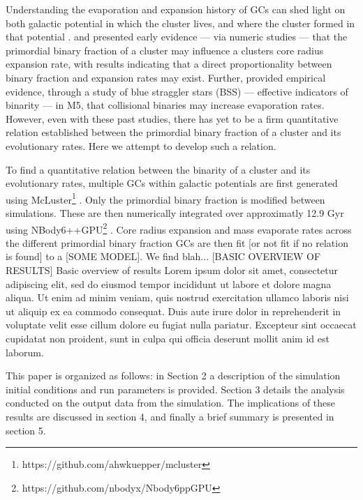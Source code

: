 \documentclass[twocolumn]{aastex62}
\newcommand{\colorred}[1]{\color{red}#1\color{black}\hspace{0.5mm}}
\begin{document}
Understanding the evaporation and expansion history of GCs can shed light on both galactic potential in which the cluster lives, and where the cluster formed in that potential \citep{Ren17}. \citet{Wil03} and \citet{Gon05} presented early evidence --- via numeric studies --- that the primordial binary fraction of a cluster may influence a clusters core radius expansion rate, with results indicating that a direct proportionality between binary fraction and expansion rates may exist. Further, \citet{Lan07} provided empirical evidence, through a study of blue straggler stars (BSS) --- effective indicators of binarity --- in M5, that collisional binaries may increase evaporation rates. However, even with these past studies, there has yet to be a firm quantitative relation established between the primordial binary fraction of a cluster and its evolutionary rates. Here we attempt to develop such a relation.

To find a quantitative relation between the binarity of a cluster and its evolutionary rates, multiple GCs within galactic potentials are first generated using McLuster\footnote{https://github.com/ahwkuepper/mcluster} \citep{Kup11}. Only the primordial binary fraction is modified between simulations. These are then numerically integrated over approximatly 12.9 Gyr using NBody6++GPU\footnote{https://github.com/nbodyx/Nbody6ppGPU} \citep{Wan15}.  Core radius expansion and mass evaporate rates across the different primordial binary fraction GCs are then fit \colorred{[or not fit if no relation is found]} to a \colorred{[SOME MODEL]}.  We find blah...\colorred{ [BASIC OVERVIEW OF RESULTS] Basic overview of results Lorem ipsum dolor sit amet, consectetur adipiscing elit, sed do eiusmod tempor incididunt ut labore et dolore magna aliqua. Ut enim ad minim veniam, quis nostrud exercitation ullamco laboris nisi ut aliquip ex ea commodo consequat. Duis aute irure dolor in reprehenderit in voluptate velit esse cillum dolore eu fugiat nulla pariatur. Excepteur sint occaecat cupidatat non proident, sunt in culpa qui officia deserunt mollit anim id est laborum.}

This paper is organized as follows: in Section 2 a description of the simulation initial conditions and run parameters is provided. Section 3 details the analysis conducted on the output data from the simulation. The implications of these results are discussed in section 4, and finally a brief summary is presented in section 5.
\end{document}
